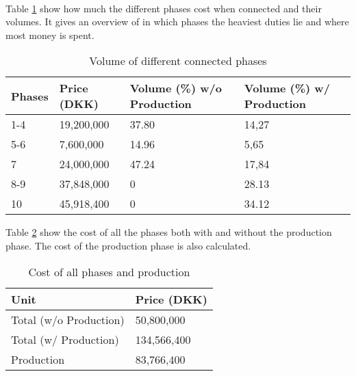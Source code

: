 ~\\

Table \ref{tab:VolumeOfPhases} show how much the different phases cost when connected and their volumes. It gives an overview of in which phases the heaviest duties lie and where most money is spent.

\begin{table}[H]
\centering
\begin{tabular}{|llll|}
\hline
\textbf{Phases} & \textbf{Price (DKK)} & \textbf{Volume (\%) w/o Production} & \textbf{Volume (\%) w/ Production}\\ \hline
1-4             & 19,200,000 & 37.80 & 14,27                                  \\
5-6             & 7,600,000 & 14.96 & 5,65                 \\
7               & 24,000,000 & 47.24 & 17,84                                  \\
8-9             & 37,848,000 & 0                  & 28.13                \\
10              & 45,918,400 & 0                  & 34.12                \\ \hline
\end{tabular}
\caption{Volume of different connected phases}
\label{tab:VolumeOfPhases}
\end{table}

Table \ref{tab:CostOfAllPhases} show the cost of all the phases both with and without the production phase. The cost of the production phase is also calculated.

\begin{table}[H]
\centering
\begin{tabular}{|l|l|}
\hline
\textbf{Unit}          & \textbf{Price (DKK)} \\ \hline
Total (w/o Production) & 50,800,000           \\
Total (w/ Production)  & 134,566,400          \\
Production             & 83,766,400           \\ \hline
\end{tabular}
\caption{Cost of all phases and production}
\label{tab:CostOfAllPhases}
\end{table}